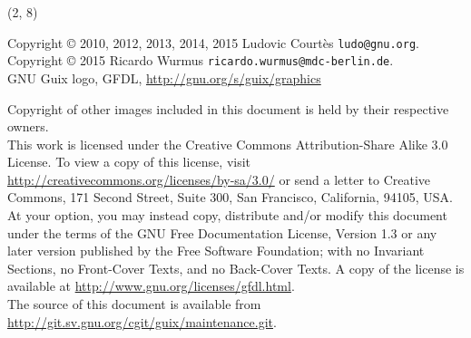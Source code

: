 \documentclass{beamer}
\begin{document}

\begin{frame}{}

  \begin{textblock}{12}(2, 8)
    \tiny{
      Copyright \copyright{} 2010, 2012, 2013, 2014, 2015 Ludovic Courtès \texttt{ludo@gnu.org}.\\
      Copyright \copyright{} 2015 Ricardo Wurmus \texttt{ricardo.wurmus@mdc-berlin.de}.
      \\[3.0mm]
      GNU Guix logo, GFDL, \url{http://gnu.org/s/guix/graphics}

      Copyright of other images included in this document is held by
      their respective owners.
      \\[3.0mm]
      This work is licensed under the \alert{Creative Commons
        Attribution-Share Alike 3.0} License.  To view a copy of this
      license, visit
      \url{http://creativecommons.org/licenses/by-sa/3.0/} or send a
      letter to Creative Commons, 171 Second Street, Suite 300, San
      Francisco, California, 94105, USA.
      \\[2.0mm]
      At your option, you may instead copy, distribute and/or modify
      this document under the terms of the \alert{GNU Free Documentation
        License, Version 1.3 or any later version} published by the Free
      Software Foundation; with no Invariant Sections, no Front-Cover
      Texts, and no Back-Cover Texts.  A copy of the license is
      available at \url{http://www.gnu.org/licenses/gfdl.html}.
      \\[2.0mm]
      The source of this document is available from
      \url{http://git.sv.gnu.org/cgit/guix/maintenance.git}.
    }
  \end{textblock}
\end{frame}
\end{document}
